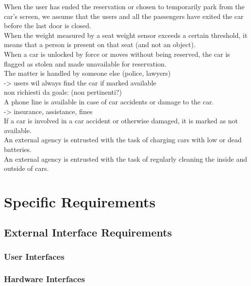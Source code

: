 \documentclass[english]{article}
\begin{document}
When the user has ended the reservation or chosen to temporarily park from the car’s screen, we assume that the users and all the passengers have exited the car before the last door is closed.\\


When the weight measured by a seat weight sensor exceeds a certain threshold, it means that a person is present on that seat (and not an object).\\


When a car is unlocked by force or moves without being reserved, the car is flagged as stolen and made unavailable for reservation. \\
The matter is handled by someone else (police, lawyers)\\
-> users wil always find the car if marked available\\


non richiesti da goals: (non pertinenti?)\\
A phone line is available in case of car accidents or damage to the car.\\
-> insurance, assistance, fines\\
If a car is involved in a car accident or otherwise damaged, it is marked as not available.\\


An external agency is entrusted with the task of charging cars with low or dead batteries.\\


An external agency is entrusted with the task of regularly cleaning the inside and outside of cars.\\


\newpage

\section{Specific Requirements}

\subsection{External Interface Requirements}

\subsubsection{User Interfaces}

\subsubsection{Hardware Interfaces}
\end{document}

